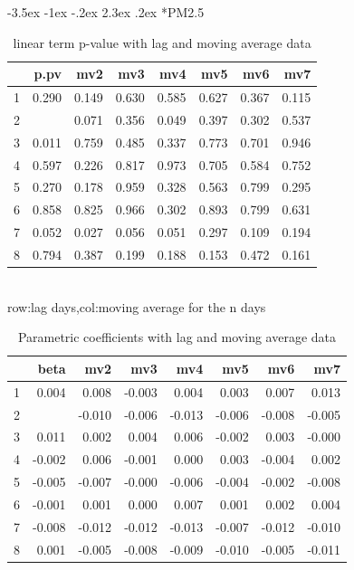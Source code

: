 \documentclass[a4paper, 12pt]{article}
\makeatletter
\def\large{\fontsize{14}{20}\selectfont}
\renewcommand\subsection{\@startsection {subsection}{1}{\z@}%
                                   {-3.5ex \@plus -1ex \@minus -.2ex}%
                                   {2.3ex \@plus.2ex}%
                                   {\centering\normalfont\large\bfseries}}
\makeatother
\begin{document}
\clearpage
\subsection*{PM2.5}
\begin{table}[h]
\centering
\caption{linear term p-value with lag and moving average data}
\begin{tabular}{rrrrrrrr}
  \hline
 & p.pv & mv2 & mv3 & mv4 & mv5 & mv6 & mv7 \\
  \hline
1 & 0.290 & 0.149 & 0.630 & 0.585 & 0.627 & 0.367 & 0.115 \\
  2 & \color{red}{0.002} & 0.071 & 0.356 & 0.049 & 0.397 & 0.302 & 0.537 \\
  3 & 0.011 & 0.759 & 0.485 & 0.337 & 0.773 & 0.701 & 0.946 \\
  4 & 0.597 & 0.226 & 0.817 & 0.973 & 0.705 & 0.584 & 0.752 \\
  5 & 0.270 & 0.178 & 0.959 & 0.328 & 0.563 & 0.799 & 0.295 \\
  6 & 0.858 & 0.825 & 0.966 & 0.302 & 0.893 & 0.799 & 0.631 \\
  7 & 0.052 & 0.027 & 0.056 & 0.051 & 0.297 & 0.109 & 0.194 \\
  8 & 0.794 & 0.387 & 0.199 & 0.188 & 0.153 & 0.472 & 0.161 \\
   \hline
\end{tabular}
\\row:lag days,col:moving average for the n days
\end{table}

\begin{table}[h]
\centering
\caption{Parametric coefficients with lag and moving average data}
\begin{tabular}{rrrrrrrr}
  \hline
 & beta & mv2 & mv3 & mv4 & mv5 & mv6 & mv7 \\
  \hline
1 & 0.004 & 0.008 & -0.003 & 0.004 & 0.003 & 0.007 & 0.013 \\
  2 & \color{red}{-0.013} & -0.010 & -0.006 & -0.013 & -0.006 & -0.008 & -0.005 \\
  3 & 0.011 & 0.002 & 0.004 & 0.006 & -0.002 & 0.003 & -0.000 \\
  4 & -0.002 & 0.006 & -0.001 & 0.000 & 0.003 & -0.004 & 0.002 \\
  5 & -0.005 & -0.007 & -0.000 & -0.006 & -0.004 & -0.002 & -0.008 \\
  6 & -0.001 & 0.001 & 0.000 & 0.007 & 0.001 & 0.002 & 0.004 \\
  7 & -0.008 & -0.012 & -0.012 & -0.013 & -0.007 & -0.012 & -0.010 \\
  8 & 0.001 & -0.005 & -0.008 & -0.009 & -0.010 & -0.005 & -0.011 \\
   \hline
\end{tabular}
\end{table}
\clearpage
\end{document}
